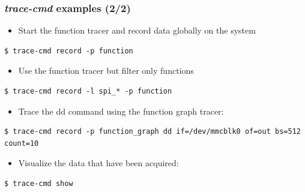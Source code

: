 \begin{frame}[fragile]
  \frametitle{{\em trace-cmd} examples (2/2)}
  \begin{itemize}
    \item Start the function tracer and record data globally on the system
  \end{itemize}
  \begin{block}{}
    \begin{verbatim}
$ trace-cmd record -p function
    \end{verbatim}
  \end{block}

  \begin{itemize}
    \item Use the function tracer but filter only  functions
  \end{itemize}
  \begin{block}{}
    \begin{verbatim}
$ trace-cmd record -l spi_* -p function
    \end{verbatim}
  \end{block}

  \begin{itemize}
    \item Trace the dd command using the function graph tracer:
  \end{itemize}
  \begin{block}{}
    \begin{verbatim}
$ trace-cmd record -p function_graph dd if=/dev/mmcblk0 of=out bs=512 count=10
    \end{verbatim}
  \end{block}

  \begin{itemize}
    \item Visualize the data that have been acquired:
  \end{itemize}
  \begin{block}{}
    \begin{verbatim}
$ trace-cmd show
    \end{verbatim}
  \end{block}
\end{frame}

